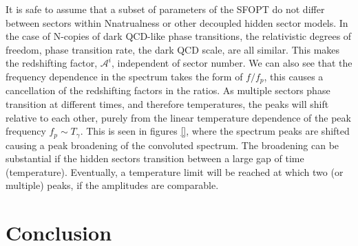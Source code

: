 \documentclass[nofootinbib,twocolumn,preprintnumbers]{revtex4-1}
\begin{document}
It is safe to assume that a subset of parameters of the SFOPT do not differ between sectors within Nnatrualness or other decoupled hidden sector models. In the case of N-copies of dark QCD-like phase transitions, the relativistic degrees of freedom, phase transition rate,  the dark QCD scale, are all similar. This makes the redshifting factor, $\mathcal{A}^i$, independent of sector number. We can also see that the frequency dependence in the spectrum takes the form of $f/f_{p}$, this causes a cancellation of the redshifting factors in the ratios. As multiple sectors phase transition at different times, and therefore temperatures, the peaks will shift relative to each other, purely from the linear temperature dependence of the peak frequency $f_{p} \sim T_{\gamma}$.  This is seen in figures \ref{}, where the spectrum peaks are shifted causing a peak broadening of the convoluted spectrum. The broadening can be substantial if the hidden sectors transition between a large gap of time (temperature). Eventually, a temperature limit will be reached at which two (or multiple) peaks, if the amplitudes are comparable. 


\section{Conclusion}
\label{sec:conclusion}


\appendix



\end{document}
